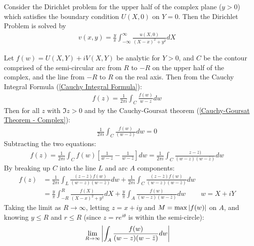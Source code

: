 \documentclass[12pt, english]{book}
\makeatletter
\renewenvironment{proof}[1][\proofname]{\par
	\pushQED{\qed}%
	\normalfont \topsep6\p@\@plus6\p@\relax
	\list{}{%
		\settowidth{\leftmargin}{\itshape\proofname:\hskip\labelsep}%
		\setlength{\labelwidth}{0pt}%
		\setlength{\itemindent}{-\leftmargin}%
	}%
	\item[\hskip\labelsep\itshape#1\@addpunct{:}]\ignorespaces
}{%
	\popQED\endlist\@endpefalse
}
\makeatother
\begin{document}
	\begin{definition}
		\label{Poisson Integral Formula (Upper Half Plane) Definition - Complex}
		Consider the Dirichlet problem for the upper half of the complex plane (\(y>0\)) which satisfies the boundary condition \(U(X,0)\) on \(Y = 0\). Then the Dirichlet Problem is solved by 
		\begin{align*}
			v(x,y) = \frac{y}{\pi} \int_{-\infty}^{\infty} \frac{u(X,0)}{(X-x)^2 + y^2} dX
		\end{align*}
	\end{definition}
	\begin{proof}
		Let \(f(w) = U(X,Y) + iV(X,Y)\) be analytic for \(Y>0\), and \(C\) be the contour comprised of the semi-circular arc from \(R\) to \(-R\) on the upper half of the complex, and the line from \(-R\) to \(R\) on the real axis. Then from the Cauchy Integral Formula (\cref{Cauchy Integral Formula}):
		\begin{align*}
			f(z) = \frac{1}{2\pi i} \int_{C} \frac{f(w)}{w-z} dw
		\end{align*}
		Then for all \(z\) with \(\Im{z}>0\) and by the Cauchy-Goursat theorem (\cref{Cauchy-Goursat Theorem - Complex}):
		\begin{align*}
			\frac{1}{2\pi i} \int_{C} \frac{f(w)}{(w-\bar{z})} dw = 0
		\end{align*}
		Subtracting the two equations:
		\begin{align*}
			f(z) 
			= \frac{1}{2\pi i} \int_{C} f(w) \left[\frac{1}{w - z} - \frac{1}{w - \bar{z}}\right] dw
			= \frac{1}{2\pi i} \int_{C} \frac{z - \bar{z})}{(w - z)(w - \bar{z})} dw
		\end{align*}
		By breaking up \(C\) into the line \(L\) and arc \(A\) components:
		\begin{align*}
			f(z) 
			&= \frac{1}{2\pi i} \int_{L} \frac{(z-\bar{z})f(w)}{(w-z)(w-\bar{z})} dw
			  + \frac{1}{2\pi i} \int_{C} \frac{(z-\bar{z})f(w)}{(w-z)(w-\bar{z})} dw \\
			&= \frac{y}{\pi} \int_{-R}^{R} \frac{f(X)}{(X-x)^2 + y^2} dX
			  + \frac{y}{\pi} \int_{A} \frac{f(w)}{(w-z)(w-\bar{z})} dw 
			  & w = X + iY
		\end{align*}
		Taking the limit as \(R \rightarrow \infty\), letting \(z = x+iy\) and \(M = \max\abs{f(w)}\) on \(A\), and knowing \(y \leq R\) and \(r \leq R\) (since \(z = re^{i\theta}\) is within the semi-circle):
		{\color{Grey}
		\begin{align*}
			&\lim_{R \rightarrow \infty}
			 \abs{\int_{A} \frac{f(w)}{(w-z)(w-\bar{z})} dw}  \\

\end{align*}}
\end{proof}
\end{document}

